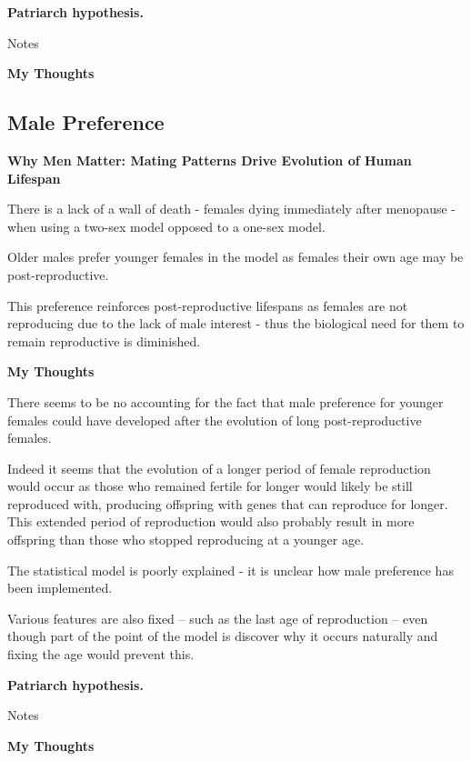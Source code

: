 \begin{framed}
\noindent \textbf{Patriarch hypothesis. \cite{patriarchHypothesis2000}}

Notes

\noindent \textbf{My Thoughts}


\end{framed}

\subsection{Male Preference}
\begin{framed}
\noindent \textbf{Why Men Matter: Mating Patterns Drive Evolution of Human Lifespan \cite{whyMenMatter2007}}

There is a lack of a wall of death - females dying immediately after menopause - when using a two-sex model opposed to a one-sex model.

Older males prefer younger females in the model as females their own age may be post-reproductive.

This preference reinforces post-reproductive lifespans as females are not reproducing due to the lack of male interest - thus the biological need for them to remain reproductive is diminished.



\noindent \textbf{My Thoughts}

There seems to be no accounting for the fact that male preference for younger females could have developed after the evolution of long post-reproductive females.

Indeed it seems that the evolution of a longer period of female reproduction would occur as those who remained fertile for longer would likely be still reproduced with, producing offspring with genes that can reproduce for longer. This extended period of reproduction would also probably result in more offspring than those who stopped reproducing at a younger age.

The statistical model is poorly explained - it is unclear how male preference has been implemented.

Various features are also fixed -- such as the last age of reproduction -- even though part of the point of the model is discover why it occurs naturally and fixing the age would prevent this.
\end{framed}

\begin{framed}
\noindent \textbf{Patriarch hypothesis. \cite{patriarchHypothesis2000}}

Notes

\noindent \textbf{My Thoughts}


\end{framed}


